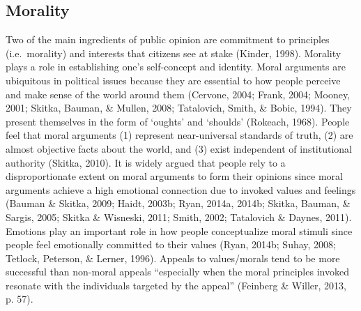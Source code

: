 \documentclass[12pt,econ]{sources/authesis}
\begin{document}
\hypertarget{framing-theory-morality}{%
\subsection{Morality}\label{framing-theory-morality}}

Two of the main ingredients of public opinion are commitment to principles (i.e.~morality) and interests that citizens see at stake (Kinder, 1998). Morality plays a role in establishing one's self-concept and identity. Moral arguments are ubiquitous in political issues because they are essential to how people perceive and make sense of the world around them (Cervone, 2004; Frank, 2004; Mooney, 2001; Skitka, Bauman, \& Mullen, 2008; Tatalovich, Smith, \& Bobic, 1994). They present themselves in the form of `oughts' and `shoulds' (Rokeach, 1968). People feel that moral arguments (1) represent near-universal standards of truth, (2) are almost objective facts about the world, and (3) exist independent of institutional authority (Skitka, 2010). It is widely argued that people rely to a disproportionate extent on moral arguments to form their opinions since moral arguments achieve a high emotional connection due to invoked values and feelings (Bauman \& Skitka, 2009; Haidt, 2003b; Ryan, 2014a, 2014b; Skitka, Bauman, \& Sargis, 2005; Skitka \& Wisneski, 2011; Smith, 2002; Tatalovich \& Daynes, 2011). Emotions play an important role in how people conceptualize moral stimuli since people feel emotionally committed to their values (Ryan, 2014b; Suhay, 2008; Tetlock, Peterson, \& Lerner, 1996). Appeals to values/morals tend to be more successful than non-moral appeals ``especially when the moral principles invoked resonate with the individuals targeted by the appeal'' (Feinberg \& Willer, 2013, p. 57).
\end{document}
